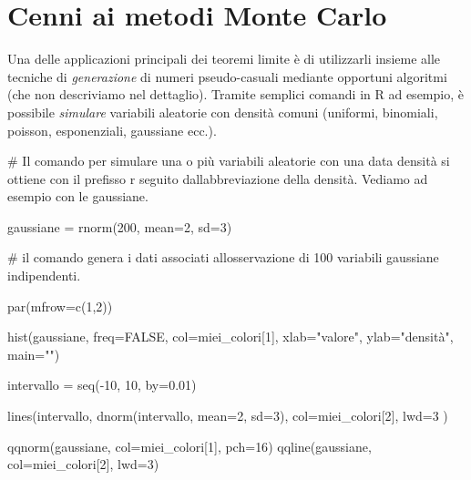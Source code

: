 \documentclass[
  italian,
  letterpaper,
]{book}
\newenvironment{Shaded}{\begin{snugshade}}{\end{snugshade}}
\newcommand{\AttributeTok}[1]{\textcolor[rgb]{0.40,0.45,0.13}{#1}}
\newcommand{\CommentTok}[1]{\textcolor[rgb]{0.37,0.37,0.37}{#1}}
\newcommand{\ConstantTok}[1]{\textcolor[rgb]{0.56,0.35,0.01}{#1}}
\newcommand{\DecValTok}[1]{\textcolor[rgb]{0.68,0.00,0.00}{#1}}
\newcommand{\FloatTok}[1]{\textcolor[rgb]{0.68,0.00,0.00}{#1}}
\newcommand{\FunctionTok}[1]{\textcolor[rgb]{0.28,0.35,0.67}{#1}}
\newcommand{\NormalTok}[1]{\textcolor[rgb]{0.00,0.23,0.31}{#1}}
\newcommand{\OtherTok}[1]{\textcolor[rgb]{0.00,0.23,0.31}{#1}}
\newcommand{\SpecialCharTok}[1]{\textcolor[rgb]{0.37,0.37,0.37}{#1}}
\newcommand{\StringTok}[1]{\textcolor[rgb]{0.13,0.47,0.30}{#1}}
\theoremstyle{definition}
\theoremstyle{remark}
\begin{document}
\section{Cenni ai metodi Monte Carlo}\label{sec-montecarlo}

Una delle applicazioni principali dei teoremi limite è di utilizzarli
insieme alle tecniche di \emph{generazione} di numeri pseudo-casuali
mediante opportuni algoritmi (che non descriviamo nel dettaglio).
Tramite semplici comandi in R ad esempio, è possibile \emph{simulare}
variabili aleatorie con densità comuni (uniformi, binomiali, poisson,
esponenziali, gaussiane ecc.).

\begin{Shaded}
\begin{Highlighting}[]
\CommentTok{\# Il comando per simulare una o più variabili aleatorie con una data densità si ottiene con il prefisso \textasciigrave{}r\textasciigrave{} seguito dall\textquotesingle{}abbreviazione della densità. Vediamo ad esempio con le gaussiane.}

\NormalTok{gaussiane }\OtherTok{=} \FunctionTok{rnorm}\NormalTok{(}\DecValTok{200}\NormalTok{, }\AttributeTok{mean=}\DecValTok{2}\NormalTok{, }\AttributeTok{sd=}\DecValTok{3}\NormalTok{)}

\CommentTok{\# il comando genera i dati associati all\textquotesingle{}osservazione di 100 variabili gaussiane indipendenti.}

\FunctionTok{par}\NormalTok{(}\AttributeTok{mfrow=}\FunctionTok{c}\NormalTok{(}\DecValTok{1}\NormalTok{,}\DecValTok{2}\NormalTok{))}

\FunctionTok{hist}\NormalTok{(gaussiane, }\AttributeTok{freq=}\ConstantTok{FALSE}\NormalTok{, }\AttributeTok{col=}\NormalTok{miei\_colori[}\DecValTok{1}\NormalTok{], }\AttributeTok{xlab=}\StringTok{"valore"}\NormalTok{, }\AttributeTok{ylab=}\StringTok{"densità"}\NormalTok{, }\AttributeTok{main=}\StringTok{""}\NormalTok{)}

\NormalTok{intervallo }\OtherTok{=} \FunctionTok{seq}\NormalTok{(}\SpecialCharTok{{-}}\DecValTok{10}\NormalTok{, }\DecValTok{10}\NormalTok{, }\AttributeTok{by=}\FloatTok{0.01}\NormalTok{)}

\FunctionTok{lines}\NormalTok{(intervallo, }\FunctionTok{dnorm}\NormalTok{(intervallo, }\AttributeTok{mean=}\DecValTok{2}\NormalTok{, }\AttributeTok{sd=}\DecValTok{3}\NormalTok{), }\AttributeTok{col=}\NormalTok{miei\_colori[}\DecValTok{2}\NormalTok{], }\AttributeTok{lwd=}\DecValTok{3}\NormalTok{ )}

\FunctionTok{qqnorm}\NormalTok{(gaussiane, }\AttributeTok{col=}\NormalTok{miei\_colori[}\DecValTok{1}\NormalTok{], }\AttributeTok{pch=}\DecValTok{16}\NormalTok{)}
\FunctionTok{qqline}\NormalTok{(gaussiane, }\AttributeTok{col=}\NormalTok{miei\_colori[}\DecValTok{2}\NormalTok{], }\AttributeTok{lwd=}\DecValTok{3}\NormalTok{)}
\end{Highlighting}
\end{Shaded}
\end{document}
